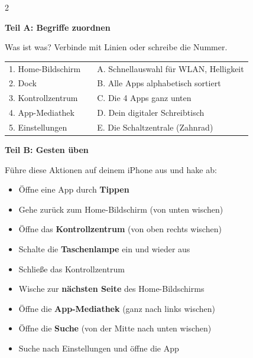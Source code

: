 \documentclass[a4paper,landscape,8pt]{extarticle}
\begin{document}
\begin{multicols}{2}

\textbf{\large Teil A: Begriffe zuordnen}

Was ist was? Verbinde mit Linien oder schreibe die Nummer.

\vspace{2mm}

\renewcommand{\arraystretch}{1.8}
\begin{tabular}{@{}p{5cm}p{1cm}p{5cm}@{}}
1. Home-Bildschirm & & A. Schnellauswahl für WLAN, Helligkeit \\
2. Dock & & B. Alle Apps alphabetisch sortiert \\
3. Kontrollzentrum & & C. Die 4 Apps ganz unten \\
4. App-Mediathek & & D. Dein digitaler Schreibtisch \\
5. Einstellungen & & E. Die Schaltzentrale (Zahnrad) \\
\end{tabular}
\renewcommand{\arraystretch}{1}

\vspace{5mm}

\textbf{\large Teil B: Gesten üben}

Führe diese Aktionen auf deinem iPhone aus und hake ab:

\vspace{2mm}

\begin{itemize}[label=$\square$, itemsep=4pt]
\item Öffne eine App durch \textbf{Tippen}
\item Gehe zurück zum Home-Bildschirm (von unten wischen)
\item Öffne das \textbf{Kontrollzentrum} (von oben rechts wischen)
\item Schalte die \textbf{Taschenlampe} ein und wieder aus
\item Schließe das Kontrollzentrum
\item Wische zur \textbf{nächsten Seite} des Home-Bildschirms
\item Öffne die \textbf{App-Mediathek} (ganz nach links wischen)
\item Öffne die \textbf{Suche} (von der Mitte nach unten wischen)
\item Suche nach \glqq Einstellungen\grqq{} und öffne die App
\end{itemize}

\vspace{5mm}


\end{multicols}
\end{document}
